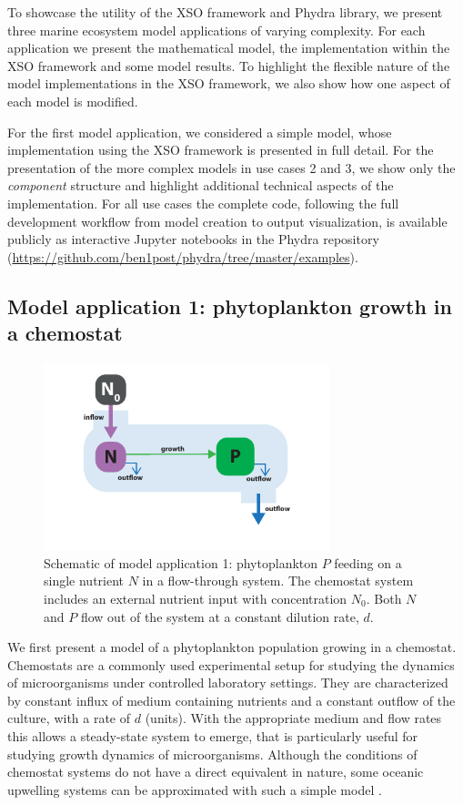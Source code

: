 \documentclass[journal abbreviation, manuscript]{copernicus}
\begin{document}
To showcase the utility of the XSO framework and Phydra library, we present three marine ecosystem model applications of varying complexity. For each application we present the mathematical model, the implementation within the XSO framework and some model results. To highlight the flexible nature of the model implementations in the XSO framework, we also show how one aspect of each model is modified.

For the first model application, we considered a simple model, whose implementation using the XSO framework is presented in full detail. For the presentation of the more complex models in use cases 2 and 3, we show only the \textit{component} structure and highlight additional technical aspects of the implementation. For all use cases the complete code, following the full development workflow from model creation to output visualization, is available publicly as interactive Jupyter notebooks in the Phydra repository (\url{https://github.com/ben1post/phydra/tree/master/examples}).

\subsection{Model application 1: phytoplankton growth in a chemostat}
\begin{figure}[t]
\includegraphics[width=8.3cm]{Figures/firstdraft_schematics/01_schematics_Chemostat.pdf}
\caption{Schematic of model application 1: phytoplankton $P$ feeding on a single nutrient $N$ in a flow-through system. The chemostat system includes an external nutrient input with concentration $N_0$. Both $N$ and $P$ flow out of the system at a constant dilution rate, $d$.}
\label{Figure:ModelSchematics_1}
\end{figure}

We first present a model of a phytoplankton population growing in a chemostat. Chemostats are a commonly used experimental setup for studying the dynamics of microorganisms under controlled laboratory settings. They are characterized by constant influx of medium containing nutrients and a constant outflow of the culture, with a rate of $d$ (units). With the appropriate medium and flow rates this allows a steady-state system to emerge, that is particularly useful for studying growth dynamics of microorganisms. Although the conditions of chemostat systems do not have a direct equivalent in nature, some oceanic upwelling systems can be approximated with such a simple model \citep{Haefner2005ModelingApplications}.
\end{document}
